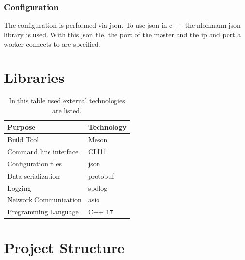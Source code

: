 \documentclass[12pt, letterpaper]{article}
\begin{document}
\subsubsection{Configuration}
The configuration is performed via json. To use json in c++ the nlohmann json library is used. With this json file, the port of the master and the ip and port a worker connects to are specified.

\section{Libraries}
\label{libraries}
\begin{table}[h]
	\centering
	\begin{tabular}{l|l}
		Purpose                       & Technology \\ \hline
		Build Tool				 	  & Meson 	   \\
		Command line interface	      & CLI11      \\
		Configuration files           & json       \\
		Data serialization            & protobuf   \\
		Logging                       & spdlog     \\
		Network Communication         & asio       \\
		Programming Language		  & C++ 17 \\
	\end{tabular}
	\caption{In this table used external technologies are listed.}
\end{table}

\newpage

\section{Project Structure}
\hfill

\newpage

\printbibliography
\end{document}
